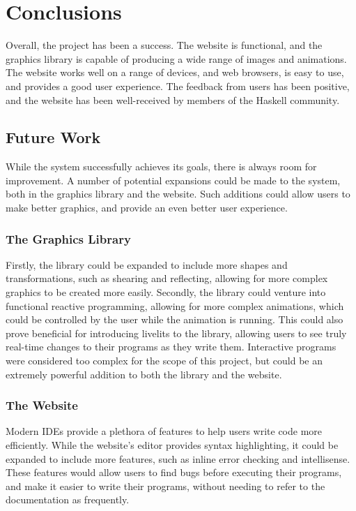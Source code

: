 \documentclass[../main.tex]{subfiles}
\begin{document}
\chapter{Conclusions} \label{ch:conclusions}
    Overall, the project has been a success.
    The website is functional, and the graphics library is capable of producing a
        wide range of images and animations.
    The website works well on a range of devices, and web browsers, is easy to use,
        and provides a good user experience.
    The feedback from users has been positive, and the website has been
        well-received by members of the Haskell community.

    \section{Future Work}
        While the system successfully achieves its goals, there is always room for
            improvement.
        A number of potential expansions could be made to the system, both in the
            graphics library and the website.
        Such additions could allow users to make better graphics, and provide an even
            better user experience.

        \subsection{The Graphics Library}
            Firstly, the library could be expanded to include more shapes and
                transformations, such as shearing and reflecting, allowing for more complex
                graphics to be created more easily.
            Secondly, the library could venture into functional reactive programming,
                allowing for more complex animations, which could be controlled by the user
                while the animation is running.
            This could also prove beneficial for introducing livelits to the library,
                allowing users to see truly real-time changes to their programs as they write
                them.
            Interactive programs were considered too complex for the scope of this project,
                but could be an extremely powerful addition to both the library and the
                website.

        \subsection{The Website}
            Modern IDEs provide a plethora of features to help users write code more
                efficiently.
            While the website's editor provides syntax highlighting, it could be expanded
                to include more features, such as inline error checking and intellisense.
            These features would allow users to find bugs before executing their programs,
                and make it easier to write their programs, without needing to refer to the
                documentation as frequently.
\end{document}

